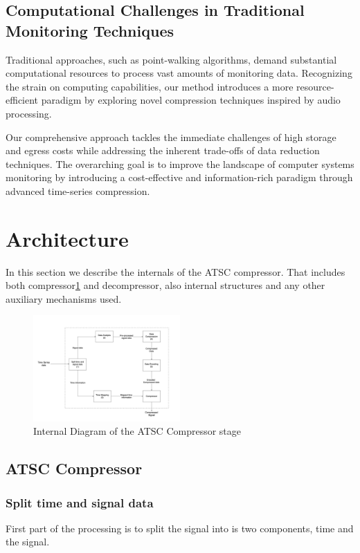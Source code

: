 \documentclass[conference]{IEEEtran}
\begin{document}
\subsection{Computational Challenges in Traditional Monitoring Techniques}
Traditional approaches, such as point-walking algorithms, demand substantial computational resources to process vast amounts of monitoring data. Recognizing the strain on computing capabilities, our method introduces a more resource-efficient paradigm by exploring novel compression techniques inspired by audio processing.

Our comprehensive approach tackles the immediate challenges of high storage and egress costs while addressing the inherent trade-offs of data reduction techniques. The overarching goal is to improve the landscape of computer systems monitoring by introducing a cost-effective and information-rich paradigm through advanced time-series compression.  

\section{Architecture}

In this section we describe the internals of the ATSC compressor. That includes both compressor\ref{internal} and decompressor, also internal structures and any other auxiliary mechanisms used.

\begin{figure}[h]
  \centering
  \includegraphics[width=0.5\textwidth]{Fig2.png}
  \caption{Internal Diagram of the ATSC Compressor stage}
  \label{internal}
\end{figure}

\subsection{ATSC Compressor}

\subsubsection{Split time and signal data}
First part of the processing is to split the signal into is two components, time and the signal.
\end{document}
